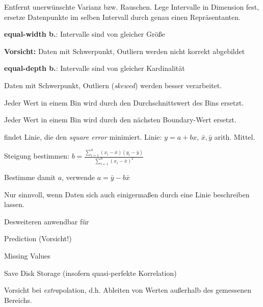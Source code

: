 \documentclass[10pt]{article} %
\begin{document}
\begin{definition}[Binning] 
      Entfernt unerwünschte Varianz bzw. Rauschen. Lege Intervalle in Dimension fest, ersetze Datenpunkte im selben Intervall durch genau einen Repräsentanten. 
      \begin{cptitemize} 
            \item \textbf{equal-width b.}: Intervalle sind von gleicher Größe
            \begin{cptitemize} 
                  \disadvantageit \textbf{Vorsicht:} Daten mit Schwerpunkt, Outliern werden nicht korrekt abgebildet 
            \end{cptitemize} 
            \item \textbf{equal-depth b.}: Intervalle sind von gleicher Kardinalität
            \begin{cptitemize} 
                  \advantageit Daten mit Schwerpunkt, Outliern (\textit{skewed}) werden besser verarbeitet.
            \end{cptitemize} 
            \item \textbf{} Jeder Wert in einem Bin wird durch den Durchschnittswert des Bins ersetzt.
 	   	 \item \textbf{} Jeder Wert in einem Bin wird durch den nächsten Boundary-Wert ersetzt.
      \end{cptitemize} 
\end{definition} 

\begin{definition}[Regression] 
        findet Linie, die den \textit{square error} minimiert. Linie: $y = a + bx$, $\bar{x}, \bar{y}$ arith. Mittel.
       \begin{cptenumerate} 
             \item Steigung bestimmen: 
             $b = \frac{
                \sum_{i=1}^{n}(x_i - \bar{x})(y_i - \bar{y})
             }{
                \sum_{i=1}^n(x_i - \bar{x})^2
             }$ 
             \item Bestimme damit $a$, verwende $a = \bar{y} - b \bar{x}$
       \end{cptenumerate}
       Nur sinnvoll, wenn Daten sich auch einigermaßen durch eine Linie beschreiben lassen.

       Desweiteren anwendbar für
       \begin{cptitemize} 
        	 \item Prediction (Vorsicht!)
        	 \item Missing Values
        	 \item Save Disk Storage (insofern quasi-perfekte Korrelation) 
       \end{cptitemize} 
       Vorsicht bei \textit{extra}polation, d.h. Ableiten von Werten außerhalb des gemessenen Bereichs.
\end{definition} 
\end{document}
